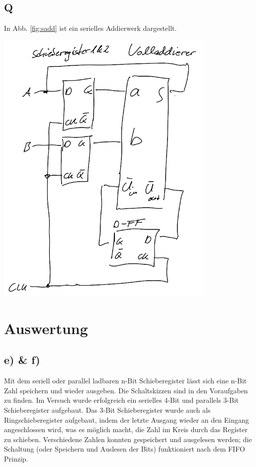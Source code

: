 \documentclass[10pt]{article}
\newenvironment{Figure}
  {\par\medskip\noindent\minipage{\linewidth}}
  {\endminipage\par\medskip}
\begin{document}
\begin{multicols}{2}
	\subsection*{Q}
	In Abb. \ref{fig:sadd} ist ein serielles Addierwerk dargestellt.
	\begin{Figure}
		\centering
		\includegraphics[width=0.8\textwidth]{serielles_addierwerk.png}
		\label{fig:sadd}
	\end{Figure}
	\section{Auswertung}
        \subsection{e) \& f)}
        Mit dem seriell oder parallel ladbaren n-Bit Schieberegister lässt sich eine n-Bit Zahl speichern und wieder ausgeben.
        Die Schaltskizzen sind in den Voraufgaben zu finden.
        Im Versuch wurde erfolgreich ein serielles 4-Bit und parallels 3-Bit Schieberegister aufgebaut.
        Das 3-Bit Schieberegister wurde auch als Ringschieberegister aufgebaut, indem der letzte Ausgang wieder an den Eingang angeschlossen wird, was es möglich macht, die Zahl \glqq im Kreis\grqq{} durch das Register zu schieben.
        Verschiedene Zahlen konnten gespeichert und ausgelesen werden; die Schaltung (oder Speichern und Auslesen der Bits) funktioniert nach dem FIFO Prinzip.


\end{multicols}
\end{document}
